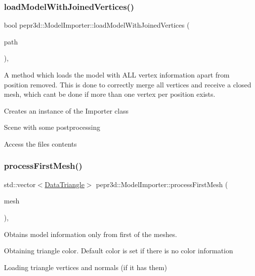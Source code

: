 \subsubsection{\texorpdfstring{loadModelWithJoinedVertices()}{loadModelWithJoinedVertices()}}
{\footnotesize\ttfamily bool pepr3d\+::\+Model\+Importer\+::load\+Model\+With\+Joined\+Vertices (\begin{DoxyParamCaption}\item[{const std\+::string \&}]{path }\end{DoxyParamCaption})\hspace{0.3cm}{\ttfamily [inline]}, {\ttfamily [private]}}



A method which loads the model with A\+LL vertex information apart from position removed. This is done to correctly merge all vertices and receive a closed mesh, which can\textquotesingle{}t be done if more than one vertex per position exists. 

Creates an instance of the Importer class

Scene with some postprocessing

Access the file\textquotesingle{}s contents \mbox{\label{classpepr3d_1_1_model_importer_acf84e4d461505e722c827812418ef0d1}} 
\subsubsection{\texorpdfstring{processFirstMesh()}{processFirstMesh()}}
{\footnotesize\ttfamily std\+::vector$<$\mbox{\hyperlink{classpepr3d_1_1_data_triangle}{Data\+Triangle}}$>$ pepr3d\+::\+Model\+Importer\+::process\+First\+Mesh (\begin{DoxyParamCaption}\item[{ai\+Mesh $\ast$}]{mesh }\end{DoxyParamCaption})\hspace{0.3cm}{\ttfamily [inline]}, {\ttfamily [private]}}



Obtains model information only from first of the meshes. 

Obtaining triangle color. Default color is set if there is no color information

Loading triangle vertices and normals (if it has them)


